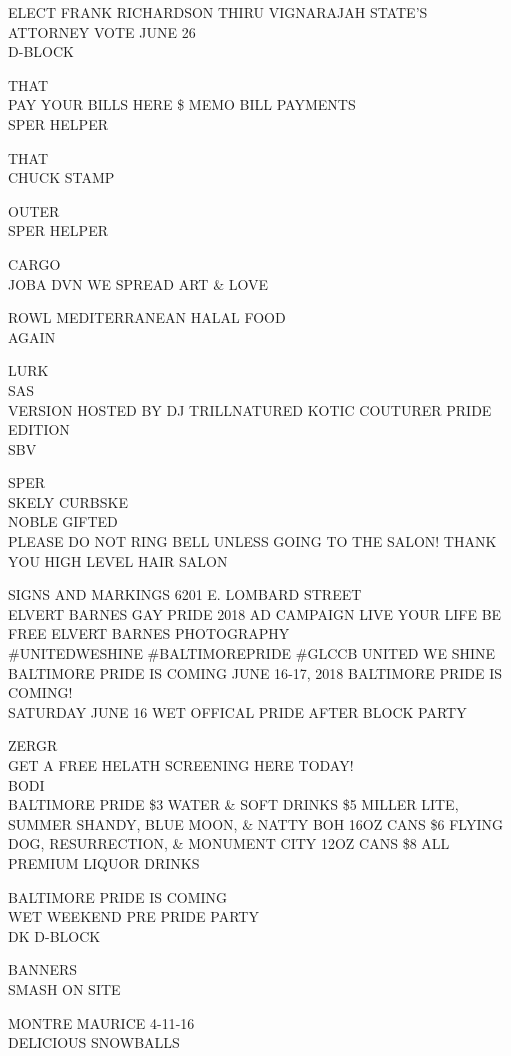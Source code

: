 \documentclass[10pt,letterpaper]{article}
\begin{document}
ELECT FRANK RICHARDSON THIRU VIGNARAJAH STATE'S ATTORNEY VOTE JUNE 26\\
D{-}BLOCK

THAT\\
PAY YOUR BILLS HERE \$ MEMO BILL PAYMENTS\\
SPER HELPER

THAT\\
CHUCK STAMP

OUTER\\
SPER HELPER

CARGO\\
JOBA DVN WE SPREAD ART \& LOVE

ROWL MEDITERRANEAN HALAL FOOD\\
AGAIN

LURK\\
SAS\\
VERSION HOSTED BY DJ TRILLNATURED KOTIC COUTURER PRIDE EDITION\\
SBV

SPER\\
SKELY CURBSKE\\
NOBLE GIFTED\\
PLEASE DO NOT RING BELL UNLESS GOING TO THE SALON!  THANK YOU  HIGH LEVEL HAIR SALON

SIGNS AND MARKINGS 6201 E. LOMBARD STREET\\
ELVERT BARNES GAY PRIDE 2018 AD CAMPAIGN LIVE YOUR LIFE BE FREE ELVERT BARNES PHOTOGRAPHY\\
\#UNITEDWESHINE \#BALTIMOREPRIDE \#GLCCB UNITED WE SHINE BALTIMORE PRIDE IS COMING JUNE 16{-}17, 2018 BALTIMORE PRIDE IS COMING!\\
SATURDAY JUNE 16 WET OFFICAL PRIDE AFTER BLOCK PARTY

ZERGR\\
GET A FREE HELATH SCREENING HERE TODAY!\\
BODI\\
BALTIMORE PRIDE \$3 WATER \& SOFT DRINKS \$5 MILLER LITE, SUMMER SHANDY, BLUE MOON, \& NATTY BOH 16OZ CANS \$6 FLYING DOG, RESURRECTION, \& MONUMENT CITY 12OZ CANS \$8 ALL PREMIUM LIQUOR DRINKS

BALTIMORE PRIDE IS COMING\\
WET WEEKEND PRE PRIDE PARTY\\
DK D{-}BLOCK

BANNERS\\
SMASH ON SITE

MONTRE MAURICE 4{-}11{-}16\\
DELICIOUS SNOWBALLS
\end{document}
